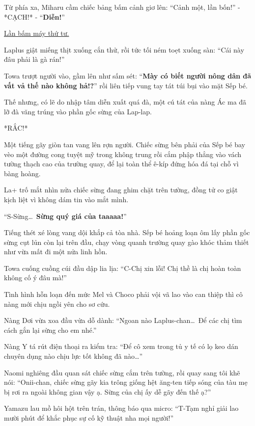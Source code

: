 \documentclass[../main.tex]{subfiles}
\begin{document}
Từ phía xa, Miharu cầm chiếc bảng bấm cảnh giơ lên: ``Cảnh một, lần bốn!'' - *CẠCH!* - ``\textbf{Diễn!}''

\begin{center}
    \uline{Lần bấm máy thứ tư.}
\end{center}

Laplus giật miếng thịt xuống cắn thử, rồi tức tối ném toẹt xuống sàn: ``Cái này đâu phải là gà rán!''

Towa trượt người vào, gầm lên như sấm sét: ``\textbf{Mày có biết người nông dân đã vất vả thế nào không hả!?}'' rồi liên tiếp vung tay tát túi bụi vào mặt Sếp bé.

Thế nhưng, có lẽ do nhập tâm diễn xuất quá đà, một cú tát của nàng Ác ma đã lỡ đà văng trúng vào phần gốc sừng của Lap-lap.

*RẮC!*

Một tiếng gãy giòn tan vang lên rợn người. Chiếc sừng bên phải của Sếp bé bay vèo một đường cong tuyệt mỹ trong không trung rồi cắm phập thẳng vào vách tường thạch cao của trường quay, để lại toàn thể ê-kíp đứng hóa đá tại chỗ vì bàng hoàng.

La+ trố mắt nhìn nửa chiếc sừng đang ghim chặt trên tường, đồng tử co giật kịch liệt vì không dám tin vào mắt mình.

``S-Sừng\dots\ \textbf{Sừng quý giá của taaaaa!}''

Tiếng thét xé lòng vang dội khắp cả tòa nhà. Sếp bé hoảng loạn ôm lấy phần gốc sừng cụt lủn còn lại trên đầu, chạy vòng quanh trường quay gào khóc thảm thiết như vừa mất đi một nửa linh hồn.

Towa cuống cuồng cúi đầu dập lia lịa: ``C-Chị xin lỗi! Chị thề là chị hoàn toàn không cố ý đâu mà!''

Tình hình hỗn loạn đến mức Mel và Choco phải vội vã lao vào can thiệp thì cô nàng mới chịu ngồi yên cho sơ cứu.

Nàng Dơi vừa xoa đầu vừa dỗ dành: ``Ngoan nào Laplus-chan\dots\ Để các chị tìm cách gắn lại sừng cho em nhé.''

Nàng Y tá rút điện thoại ra kiểm tra: ``Để cô xem trong tủ y tế có lọ keo dán chuyên dụng nào chịu lực tốt không đã nào\dots''

Naomi nghiêng đầu quan sát chiếc sừng cắm trên tường, rồi quay sang tôi khẽ nói: ``Onii-chan, chiếc sừng gãy kia trông giống hệt ăng-ten tiếp sóng của tàu mẹ bị rơi ra ngoài không gian vậy ạ. Sừng của chị ấy dễ gãy đến thế ạ?''

Yamazu lau mồ hôi hột trên trán, thông báo qua micro: ``T-Tạm nghỉ giải lao mười phút để khắc phục sự cố kỹ thuật nha mọi người!''
\end{document}
